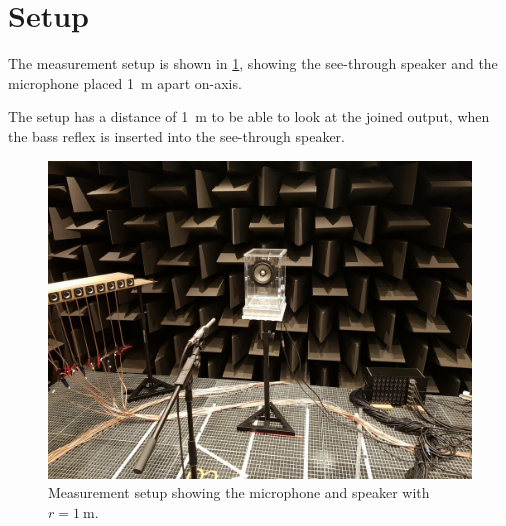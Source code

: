 \section{Setup}
The measurement setup is shown in \cref{fig:meassetup}, showing the see-through speaker and the microphone placed \SI{1}{\metre} apart on-axis.

The setup has a distance of \SI{1}{\metre} to be able to look at the joined output, when the bass reflex is inserted into the see-through speaker.

\begin{figure}
	\centering
	\includegraphics[width=0.9\linewidth, clip, trim={5cm, 0, 5cm, 3cm}]{gfx/meas_setup.jpg}
	\caption{Measurement setup showing the microphone and speaker with $r=\SI{1}{\metre}$.}
	\label{fig:meassetup}
\end{figure}